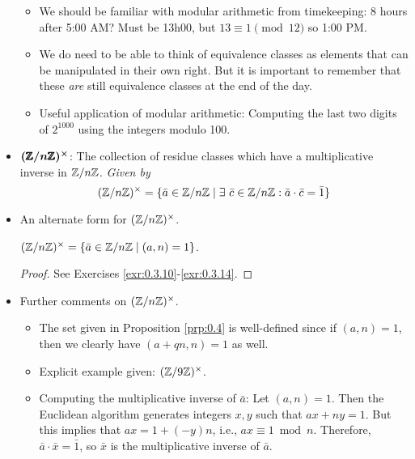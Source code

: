 \documentclass[../notes.tex]{subfiles}
\begin{document}
\begin{itemize}
\begin{itemize}
        \item We should be familiar with modular arithmetic from timekeeping: 8 hours after 5:00 AM? Must be 13h00, but $13\equiv 1\pmod{12}$ so 1:00 PM.
        \item We do need to be able to think of equivalence classes as elements that can be manipulated in their own right. But it is important to remember that these \emph{are} still equivalence classes at the end of the day.
        \item Useful application of modular arithmetic: Computing the last two digits of $2^{1000}$ using the integers modulo 100.
    \end{itemize}
    \item $\bm{(\pmb{\mathbb{Z}}/n\pmb{\mathbb{Z}})^\times}$: The collection of residue classes which have a multiplicative inverse in $\mathbb{Z}/n\mathbb{Z}$. \emph{Given by}
    \begin{equation*}
        (\Z/n\Z)^\times = \{\bar{a}\in\Z/n\Z\mid \exists\ \bar{c}\in\Z/n\Z:\bar{a}\cdot\bar{c}=\bar{1}\}
    \end{equation*}
    \item An alternate form for $(\mathbb{Z}/n\mathbb{Z})^\times$.
    \begin{proposition}\label{prp:0.4}
        $(\mathbb{Z}/n\mathbb{Z})^\times=\{\bar{a}\in\mathbb{Z}/n\mathbb{Z}\mid(a,n)=1\}$.
        \begin{proof}
            See Exercises \ref{exr:0.3.10}-\ref{exr:0.3.14}.
        \end{proof}
    \end{proposition}
    \item Further comments on $(\mathbb{Z}/n\mathbb{Z})^\times$.
    \begin{itemize}
        \item The set given in Proposition \ref{prp:0.4} is well-defined since if $(a,n)=1$, then we clearly have $(a+qn,n)=1$ as well.
        \item Explicit example given: $(\mathbb{Z}/9\mathbb{Z})^\times$.
        \item Computing the multiplicative inverse of $\bar{a}$: Let $(a,n)=1$. Then the Euclidean algorithm generates integers $x,y$ such that $ax+ny=1$. But this implies that $ax=1+(-y)n$, i.e., $ax\equiv 1\bmod n$. Therefore, $\bar{a}\cdot\bar{x}=\bar{1}$, so $\bar{x}$ is the multiplicative inverse of $\bar{a}$.
    \end{itemize}
\end{itemize}
\end{document}
